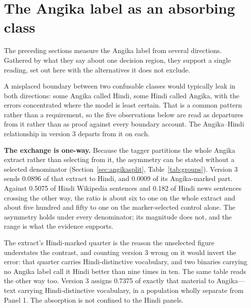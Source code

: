 \documentclass[final]{clv2025}
\begin{document}
\section{The Angika label as an absorbing class}\label{sec:absorbing}

The preceding sections measure the Angika label from several directions. Gathered by what they say about one decision region, they support a single reading, set out here with the alternatives it does not exclude.

A misplaced boundary between two confusable classes would typically leak in both directions: some Angika called Hindi, some Hindi called Angika, with the errors concentrated where the model is least certain. That is a common pattern rather than a requirement, so the five observations below are read as departures from it rather than as proof against every boundary account. The Angika--Hindi relationship in version 3 departs from it on each.

\textbf{The exchange is one-way.} Because the tagger partitions the whole Angika extract rather than selecting from it, the asymmetry can be stated without a selected denominator (Section~\ref{sec:angikasplit}, Table~\ref{tab:groups}). Version 3 sends 0.0896 of that extract to Hindi, and 0.0009 of its Angika-marked part. Against 0.5075 of Hindi Wikipedia sentences and 0.182 of Hindi news sentences crossing the other way, the ratio is about six to one on the whole extract and about five hundred and fifty to one on the marker-selected control alone. The asymmetry holds under every denominator; its magnitude does not, and the range is what the evidence supports.

The extract's Hindi-marked quarter is the reason the unselected figure understates the contrast, and counting version 3 wrong on it would invert the error: that quarter carries Hindi-distinctive vocabulary, and two binaries carrying no Angika label call it Hindi better than nine times in ten. The same table reads the other way too. Version 3 assigns 0.7375 of exactly that material to Angika---text carrying Hindi-distinctive vocabulary, in a population wholly separate from Panel 1. The absorption is not confined to the Hindi panels.
\end{document}
